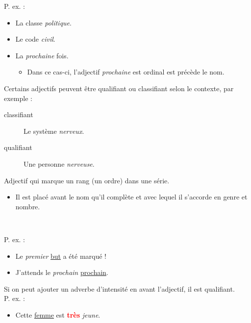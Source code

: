 \documentclass[10pt, french]{article}
\begin{document}
\begin{multicols*}{2}
\begin{definitionNOHFILLsub}
P. ex. : 
\begin{itemize}
	\item	La classe \textit{politique}.
	\item	Le code \textit{civil}.
	\item	La \textit{prochaine} fois.
		\begin{itemize}
		\item	Dans ce cas-ci, l'adjectif \textit{prochaine} est ordinal est précède le nom.
		\end{itemize}
\end{itemize}
\end{definitionNOHFILLsub}

\begin{astuces}
Certains adjectifs peuvent être qualifiant ou classifiant selon le contexte, par exemple : 
\begin{description}
	\item[classifiant]	Le système \textit{nerveux}.
	\item[qualifiant]	Une personne \textit{nerveuse}.
\end{description}
\end{astuces}

\begin{definitionNOHFILLprop}
Adjectif qui marque un rang (un ordre) dans une série.
\begin{itemize}
	\item	Il est placé avant le nom qu'il complète et avec lequel il s'accorde en genre et nombre.
\end{itemize}

\

P. ex. : 
\begin{itemize}
	\item	Le \textit{premier} \underline{but} a été marqué !
	\item	J'attends le \textit{prochain} \underline{prochain}.
\end{itemize}
\end{definitionNOHFILLprop}

\begin{astuces}
Si on peut ajouter un adverbe d'intensité en avant l'adjectif, il est qualifiant.\\

P. ex. : 
\begin{itemize}
	\item	Cette \underline{femme} est \textcolor{red}{\textbf{très}} \textit{jeune}.
\end{itemize}
\end{astuces}



\end{multicols*}
\end{document}
